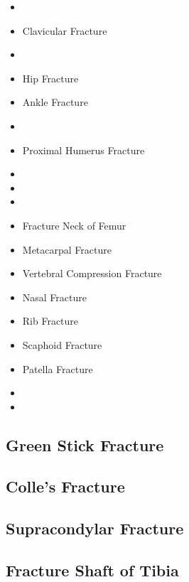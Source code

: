\documentclass[11pt, a4paper]{article}
\begin{document}
\begin{itemize}
    \item {}\footnotemark[1]\footnotemark[2]
    \item Clavicular Fracture
    \item {}\footnotemark[1]\footnotemark[2]
    \item Hip Fracture
    \item Ankle Fracture
    \item {}\footnotemark[1]\footnotemark[2]
    \item Proximal Humerus Fracture
    \item {}\footnotemark[2]
    \item {}\footnotemark[2]
    \item {}\footnotemark[1]\footnotemark[2]
    \item Fracture Neck of Femur\footnotemark[1]\footnotemark[2]
    \item Metacarpal Fracture
    \item Vertebral Compression Fracture
    \item Nasal Fracture
    \item Rib Fracture
    \item Scaphoid Fracture
    \item Patella Fracture
    \item {}\footnotemark[2]
    \item {}\footnotemark[2]
\end{itemize}

\subsection{Green Stick Fracture}
\label{subsec:greenStickFracture}

\subsection{Colle's Fracture}
\label{subsec:collesFracture}
\subsection{Supracondylar Fracture}
\label{subsec:supracondylarFracture}
\subsection{Fracture Shaft of Tibia}
\label{subsec:fractureShaftTibia}
\end{document}
